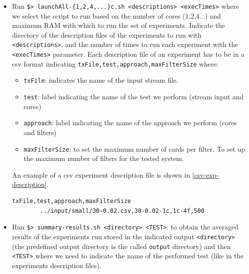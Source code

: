 \begin{itemize}
    \item Run \texttt{\$> launchAll-\{1,2,4,...\}c.sh <descriptions> <execTimes>} where we select the script to run based on the number of cores (1,2,4...) and maximum RAM with which to run the set of experiments. Indicate the directory of the description files of the experiments to run with \texttt{<descriptions>}, and the number of times to run each experiment with the \texttt{<execTimes>} parameter.
    Each description file of an experiment has to be in a csv format indicating \texttt{txFile,test,approach,maxFilterSize} where:
    \begin{itemize}
        \item \texttt{txFile}: indicates the name of the input stream file.
        \item \texttt{test}: label indicating the name of the test we perform (stream input and cores)
        \item \texttt{approach}: label indicating the name of the approach we perform (cores and filters)
        \item \texttt{maxFilterSize}: to set the maximum number of cards per filter. To set up the maximum number of filters for the tested system.
    \end{itemize}
    An example of a csv experiment description file is shown in \ref{csv-exp-description}.
    \begin{center}
    \lstset{style=cypherStyle}
    \begin{lstlisting}[caption={30-0.02-1c-4f}, label={csv-exp-description}]
        txFile,test,approach,maxFilterSize
        ../input/small/30-0.02.csv,30-0.02-1c,1c-4f,500
    \end{lstlisting}
    \end{center}
    \item Run \texttt{\$> summary-results.sh <directory> <TEST>}: to obtain the averaged results of the experiments run stored in the indicated output \texttt{<directory>} (the predefined output directory is the called \texttt{output} directory) and then \texttt{<TEST>} where we need to indicate the name of the performed test (like in the experiments description files).
\end{itemize}


